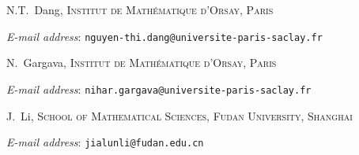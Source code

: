 \documentclass[11pt,letterpaper]{amsart}
\theoremstyle{definition}
\theoremstyle{remark}
\begin{document}
	
		\raggedbottom
		
	
	
	
	\bigskip  

	  N.T.~Dang, \textsc{Institut de Mathématique d'Orsay,
    Paris}\par\nopagebreak
  \textit{E-mail address}:  \texttt{nguyen-thi.dang@universite-paris-saclay.fr }

  \medskip

  N.~Gargava, \textsc{Institut de Mathématique d'Orsay,
    Paris}\par\nopagebreak
  \textit{E-mail address}:  \texttt{nihar.gargava@universite-paris-saclay.fr}

 

  \medskip

  J.~Li, \textsc{%
    School of Mathematical Sciences, Fudan University, Shanghai}\par\nopagebreak 
  \textit{E-mail address}:  \texttt{jialunli@fudan.edu.cn}


	
\end{document}
